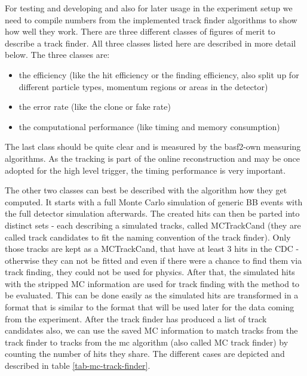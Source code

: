 For testing and developing and also for later usage in the experiment setup we need to compile numbers from the implemented track finder algorithms to show how well they work. There are three different classes of figures of merit to describe a track finder. All three classes listed here are described in more detail below. The three classes are:
\begin{itemize}
  \item the efficiency (like the hit efficiency or the finding efficiency, also split up for different particle types, momentum regions or areas in the detector)
  \item the error rate (like the clone or fake rate)
  \item the computational performance (like timing and memory consumption)
\end{itemize}

The last class should be quite clear and is measured by the basf2-own measuring algorithms. As the tracking is part of the online reconstruction and may be once adopted for the high level trigger, the timing performance is very important. 

The other two classes can best be described with the algorithm how they get computed. It starts with a full Monte Carlo simulation of generic BB events with the full detector simulation afterwards. The created hits can then be parted into distinct sets - each describing a simulated tracks, called MCTrackCand (they are called track candidates to fit the naming convention of the track finder). Only those tracks are kept as a MCTrackCand, that have at least 3 hits in the CDC - otherwise they can not be fitted and even if there were a chance to find them via track finding, they could not be used for physics. After that, the simulated hits with the stripped MC information are used for track finding with the method to be evaluated. This can be done easily as the simulated hits are transformed in a format that is similar to the format that will be used later for the data coming from the experiment. After the track finder has produced a list of track candidates also, we can use the saved MC information to match tracks from the track finder to tracks from the mc algorithm (also called MC track finder) by counting the number of hits they share. The different cases are depicted and described in table \ref{tab-mc-track-finder}.

